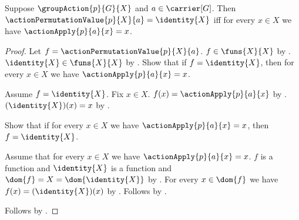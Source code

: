 \begin{proposition}\label{action_permutation_value_identity_iff}
    Suppose $\groupAction{p}{G}{X}$ and $a\in\carrier[G]$.
    Then
        $\actionPermutationValue{p}{X}{a}=\identity{X}$ iff
        for every $x\in X$ we have $\actionApply{p}{a}{x}=x$.
\end{proposition}
\begin{proof}
    Let $f=\actionPermutationValue{p}{X}{a}$.
    $f\in\funs{X}{X}$ by
        .
    $\identity{X}\in\funs{X}{X}$ by .
    Show that if $f=\identity{X}$, then for every $x\in X$ we have
        $\actionApply{p}{a}{x}=x$.
    \begin{subproof}
        Assume $f=\identity{X}$.
        Fix $x\in X$.
        $f(x)=\actionApply{p}{a}{x}$ by
            .
        $(\identity{X})(x)=x$ by .
    \end{subproof}
    Show that if for every $x\in X$ we have
        $\actionApply{p}{a}{x}=x$, then $f=\identity{X}$.
    \begin{subproof}
        Assume that for every $x\in X$ we have
            $\actionApply{p}{a}{x}=x$.
        $f$ is a function and $\identity{X}$ is a function and
            $\dom{f}=X=\dom{\identity{X}}$ by
            .
        For every $x\in\dom{f}$ we have
            $f(x)=(\identity{X})(x)$ by
            .
        Follows by .
    \end{subproof}
    Follows by \auto.
\end{proof}

